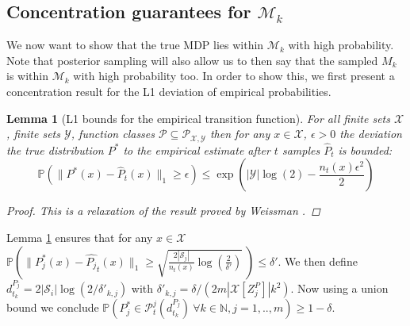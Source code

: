\documentclass{article}
\newtheorem{lemma}{Lemma}
\newcommand{\Exp}{\mathds{E}}
\newcommand{\Prob}{\mathds{P}}
\newcommand{\Real}{\mathds{R}}
\newcommand{\Nat}{\mathbb{N}}
\newcommand{\Xc}{\mathcal{X}}
\newcommand{\Yc}{\mathcal{Y}}
\newcommand{\Pc}{\mathcal{P}}
\newcommand{\Sc}{\mathcal{S}}
\newcommand{\Mc}{\mathcal{M}}
\begin{document}
\subsection{Concentration guarantees for $\Mc_k$}
We now want to show that the true MDP lies within $\Mc_k$ with high probability.
Note that posterior sampling will also allow us to then say that the sampled $M_k$ is within $\Mc_k$ with high probability too.
In order to show this, we first present a concentration result for the L1 deviation of empirical probabilities.

\begin{lemma}[L1 bounds for the empirical transition function]
\label{lem: weissman} \hspace{0.000000001mm} \newline
For all finite sets $\Xc$, finite sets $\Yc$, function classes $\Pc \subseteq \Pc_{\Xc,\Yc}$ then for any $x \in \Xc$, $\epsilon > 0$ the deviation the true distribution $P^*$ to the empirical estimate after $t$ samples $\hat{P}_t$ is bounded:
\begin{equation*}
	\Prob \left( \| P^*(x) - \hat{P}_t(x) \|_1 \ge \epsilon \right) \le \exp \left( |\Yc| \log(2) - \frac{n_t(x) \epsilon^2}{2} \right)
\end{equation*}
\begin{proof}
This is a relaxation of the result proved by Weissman \cite{weissman2003inequalities}.
\end{proof}
\end{lemma}
Lemma \ref{lem: weissman} ensures that for any $x \in \Xc$
$\Prob ( \| P_j^*(x) - \hat{P_j}_t(x) \|_{1} \ge \sqrt{\frac{2 | \Sc_j |}{n_t(x)}\log\left( \frac{2}{\delta'} \right)} \ ) \le \delta'$.
We then define $d^{P_j}_{t_k} = 2 | \Sc_i | \log( 2/ \delta'_{k,j} )$ with $\delta'_{k,j} = \delta / (2 m | \Xc[Z^P_j] | k^2)$.
Now using a union bound we conclude %
$\Prob ( P^*_j \in \Pc^j_t(d_{t_k}^{P_j}) \ \forall k \in \Nat,j=1,..,m ) \ge 1 - \delta $.

\end{document}
